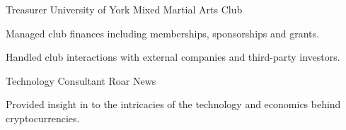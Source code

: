 \begin{cventries}
  \cventry
    {Treasurer}
    {University of York Mixed Martial Arts Club}
    {}
    {}
    {
      \begin{cvitems}
        \item {Managed club finances including memberships, sponsorships and grants.}
        \vspace{0.5mm}
        \item {Handled club interactions with external companies and third-party investors.}
      \end{cvitems}
    }
    
  \cventry
    {Technology Consultant}
    {Roar News}
    {}
    {}
    {
      \begin{cvitems}
        \item {Provided insight in to the intricacies of the technology and economics behind cryptocurrencies.}
      \end{cvitems}
    }
\end{cventries}